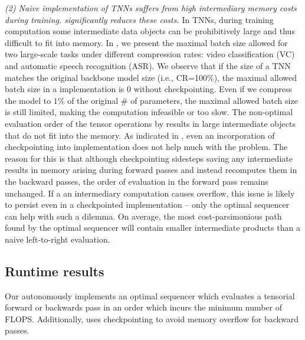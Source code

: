 \emph{(2) Naive \pytorch implementation of TNNs suffers from high intermediary memory costs during training. \autotnn significantly reduces these costs.}
In TNNs, during training computation some intermediate data objects can be prohibitively large and thus difficult to fit into memory. In , we present the maximal batch size allowed for two large-scale tasks under different compression rates: video classification (VC) and automatic speech recognition (ASR).
We observe that if the size of a TNN matches the original backbone model size (i.e., CR=100\%), the maximal allowed batch size in a \pytorch implementation is 0 without checkpointing.
Even if we compress the model to $1\%$ of the original \# of parameters, the maximal allowed batch size is still limited, making the computation infeasible or too slow. 
The non-optimal evaluation order of the tensor operations by \pytorch results in large intermediate objects that do not fit into the memory.
As indicated in , even an incorporation of checkpointing into \pytorch implementation does not help much with the problem.
The reason for this is that although checkpointing sidesteps saving any intermediate results in memory arising during forward passes and instead recomputes them in the backward passes, the order of evaluation in the forward pass remains unchanged. If a an intermediary computation causes overflow, this issue is likely to persist even in a checkpointed implementation -- only the optimal sequencer can help with such a dilemma. On average, the most cost-parsimonious path found by the optimal sequencer will contain smaller intermediate products than a naive left-to-right \pytorch evaluation. 




\subsection{Runtime results}
\label{sub:runtime}
Our \conveinsum autonomously implements an %
optimal sequencer which evaluates a tensorial forward or backwards pass in an order which incurs the minimum number of FLOPS. 
Additionally, \conveinsum uses checkpointing to avoid memory overflow for backward passes.

% 
%



